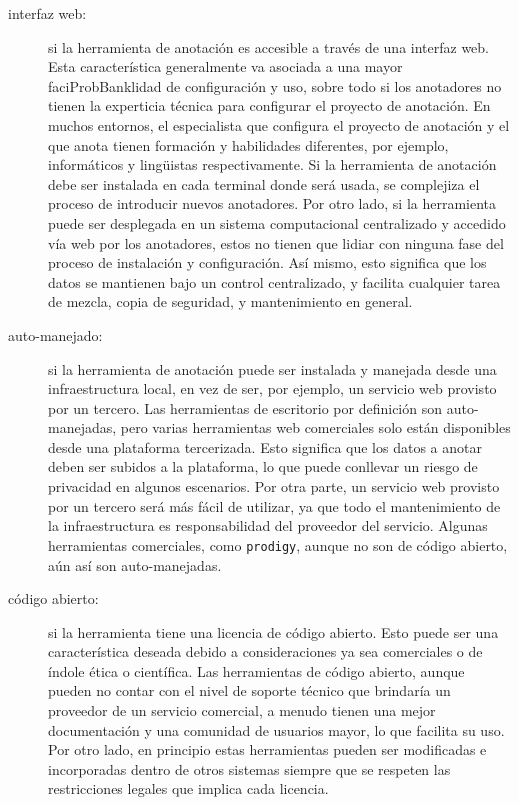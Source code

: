 \begin{description}
  \item[interfaz web:] si la herramienta de anotación es accesible a través de una interfaz web. Esta característica generalmente va asociada a una mayor faciProbBanklidad de configuración y uso, sobre todo si los anotadores no tienen la experticia técnica para configurar el proyecto de anotación. En muchos entornos, el especialista que configura el proyecto de anotación y el que anota tienen formación y habilidades diferentes, por ejemplo, informáticos y lingüistas respectivamente. Si la herramienta de anotación debe ser instalada en cada terminal donde será usada, se complejiza el proceso de introducir nuevos anotadores. Por otro lado, si la herramienta puede ser desplegada en un sistema computacional centralizado y accedido vía web por los anotadores, estos no tienen que lidiar con ninguna fase del proceso de instalación y configuración. Así mismo, esto significa que los datos se mantienen bajo un control centralizado, y facilita cualquier tarea de mezcla, copia de seguridad, y mantenimiento en general.
  \item[auto-manejado:] si la herramienta de anotación puede ser instalada y manejada desde una infraestructura local, en vez de ser, por ejemplo, un servicio web provisto por un tercero. Las herramientas de escritorio por definición son auto-manejadas, pero varias herramientas web comerciales solo están disponibles desde una plataforma tercerizada. Esto significa que los datos a anotar deben ser subidos a la plataforma, lo que puede conllevar un riesgo de privacidad en algunos escenarios. Por otra parte, un servicio web provisto por un tercero será más fácil de utilizar, ya que todo el mantenimiento de la infraestructura es responsabilidad del proveedor del servicio. Algunas herramientas comerciales, como \texttt{prodigy}, aunque no son de código abierto, aún así son auto-manejadas.
  \item[código abierto:] si la herramienta tiene una licencia de código abierto. Esto puede ser  una característica deseada debido a consideraciones ya sea comerciales o de índole ética o científica. Las herramientas de código abierto, aunque pueden no contar con el nivel de soporte técnico que brindaría un proveedor de un servicio comercial, a menudo tienen una mejor documentación y una comunidad de usuarios mayor, lo que facilita su uso. Por otro lado, en principio estas herramientas pueden ser modificadas e incorporadas dentro de otros sistemas siempre que se respeten las restricciones legales que implica cada licencia.
\end{description}

